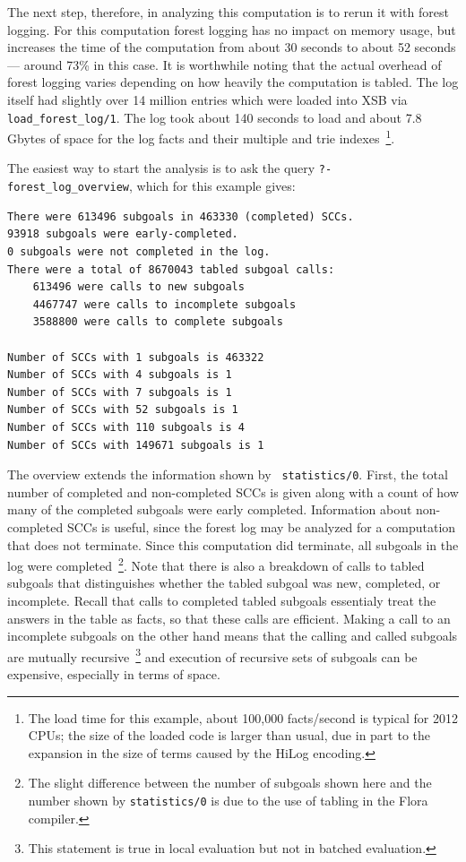 \begin{example}
The next step, therefore, in analyzing this computation is to rerun it
with forest logging.  For this computation forest logging has no
impact on memory usage, but increases the time of the computation from
about 30 seconds to about 52 seconds --- around 73\% in this case.  It
is worthwhile noting that the actual overhead of forest logging varies
depending on how heavily the computation is tabled.  The log itself
had slightly over 14 million entries which were loaded into XSB via
{\tt load\_forest\_log/1}.  The log took about 140 seconds to load and
about 7.8 Gbytes of space for the log facts and their multiple and
trie indexes~\footnote{The load time for this example, about 100,000
  facts/second is typical for 2012 CPUs; the size of the loaded code
  is larger than usual, due in part to the expansion in the size of
  terms caused by the HiLog encoding.}.

The easiest way to start the analysis is to ask the query {\tt ?-
  forest\_log\_overview}, which for this example gives:
%
\begin{verbatim}
There were 613496 subgoals in 463330 (completed) SCCs.  
93918 subgoals were early-completed.  
0 subgoals were not completed in the log.
There were a total of 8670043 tabled subgoal calls:
    613496 were calls to new subgoals
    4467747 were calls to incomplete subgoals
    3588800 were calls to complete subgoals

Number of SCCs with 1 subgoals is 463322
Number of SCCs with 4 subgoals is 1
Number of SCCs with 7 subgoals is 1
Number of SCCs with 52 subgoals is 1
Number of SCCs with 110 subgoals is 4
Number of SCCs with 149671 subgoals is 1
\end{verbatim}
%
%
The overview extends the information shown by {\tt
  statistics/0}.  First, the total number of completed and
non-completed SCCs is given along with a count of how many of the
completed subgoals were early completed.  Information about
non-completed SCCs is useful, since the forest log may be analyzed for
a computation that does not terminate.  Since this computation did
terminate, all subgoals in the log were completed~\footnote{The slight
  difference between the number of subgoals shown here and the number
  shown by {\tt statistics/0} is due to the use of tabling in the
  Flora compiler.}.  Note that there is also a breakdown of calls to
tabled subgoals that distinguishes whether the tabled subgoal was new,
completed, or incomplete.  Recall that calls to completed tabled
subgoals essentialy treat the answers in the table as facts, so that
these calls are efficient.  Making a call to an incomplete subgoals on
the other hand means that the calling and called subgoals are mutually
recursive~\footnote{This statement is true in local evaluation but not
  in batched evaluation.} and execution of recursive sets of subgoals
can be expensive, especially in terms of space.


\end{example}
